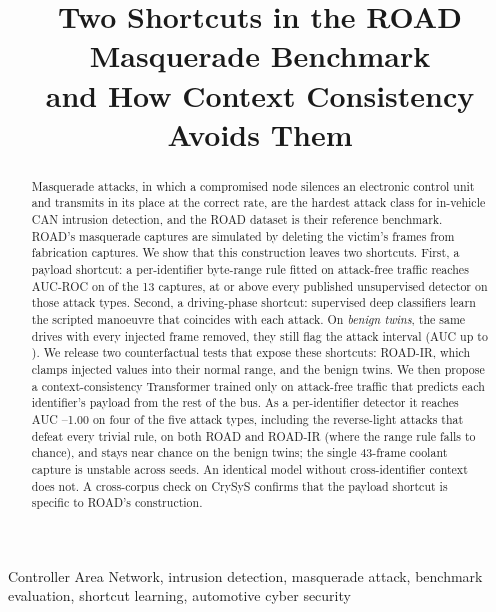 \documentclass[conference]{IEEEtran}
\begin{document}
\title{Two Shortcuts in the ROAD Masquerade Benchmark\\and How Context Consistency Avoids Them}

\author{
}

\maketitle

\begin{abstract}
Masquerade attacks, in which a compromised node silences an electronic control unit and transmits in its place at the correct rate, are the hardest attack class for in-vehicle CAN intrusion detection, and the ROAD dataset is their reference benchmark. ROAD's masquerade captures are simulated by deleting the victim's frames from fabrication captures. We show that this construction leaves two shortcuts. First, a payload shortcut: a per-identifier byte-range rule fitted on attack-free traffic reaches AUC-ROC \ExtAUCmin{} on \NExtCaps{} of the 13 captures, at or above every published unsupervised detector on those attack types. Second, a driving-phase shortcut: supervised deep classifiers learn the scripted manoeuvre that coincides with each attack. On \emph{benign twins}, the same drives with every injected frame removed, they still flag the attack interval (AUC up to \SupTwinMax). We release two counterfactual tests that expose these shortcuts: ROAD-IR, which clamps injected values into their normal range, and the benign twins. We then propose a context-consistency Transformer trained only on attack-free traffic that predicts each identifier's payload from the rest of the bus. As a per-identifier detector it reaches AUC \CtxFourMin--1.00 on four of the five attack types, including the reverse-light attacks that defeat every trivial rule, on both ROAD and ROAD-IR (where the range rule falls to chance), and stays near chance on the benign twins; the single 43-frame coolant capture is unstable across seeds. An identical model without cross-identifier context does not. A cross-corpus check on CrySyS confirms that the payload shortcut is specific to ROAD's construction.
\end{abstract}

\begin{IEEEkeywords}
Controller Area Network, intrusion detection, masquerade attack, benchmark evaluation, shortcut learning, automotive cyber security
\end{IEEEkeywords}
\end{document}
